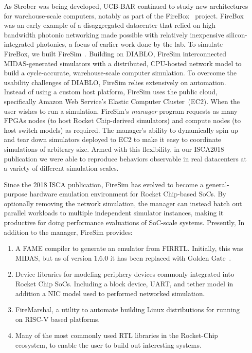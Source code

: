 As Strober was being developed, UCB-BAR continued to study new architectures for
warehouse-scale computers, notably as part of the FireBox~\cite{FireBox} project.
FireBox was an early example of a disaggregated datacenter that relied on
high-bandwidth photonic networking made possible with relatively inexpensive
silicon-integrated photonics, a focus of earlier work done by the lab.  To
simulate FireBox, we built FireSim~\cite{FireSim}. Building on DIABLO, FireSim interconnected MIDAS-generated
simulators with a distributed, CPU-hosted network model to build a
cycle-accurate, warehouse-scale computer simulation. To overcome the usability
challenges of DIABLO, FireSim relies extensively on automation.  Instead of
using a custom host platform, FireSim uses the public cloud, specifically
Amazon Web Service's Elastic Computer Cluster~(EC2).  When the user wishes to run a simulation, FireSim's \emph{manager} program
requests as many FPGAs nodes (to host
Rocket Chip-derived simulators) and compute nodes (to host switch models) as
required. The manager's ability to dynamically spin up and tear down simulators
deployed to EC2 to make it easy to coordinate simulations of arbitrary size. Armed with this flexibility, in our
ISCA2018 publication we were able to reproduce behaviors observable in real
datacenters at a variety of different simulation scales.

Since the 2018 ISCA publication, FireSim has evolved to become a
general-purpose hardware emulation environment for Rocket Chip-based SoCs. By
optionally removing the network simulation, the manager can instead batch out
parallel workloads to multiple independent simulator instances, making it
productive for doing performance evaluations of SoC-scale systems.
Presently, In addition to the manager, FireSim provides:
\begin{enumerate}
    \item A FAME compiler to generate an emulator from FIRRTL. Initially, this
        was MIDAS, but as of version 1.6.0 it has been replaced with Golden Gate~\cite{GoldenGate}.
    \item Device libraries for modeling periphery devices commonly integrated into Rocket Chip SoCs. Including a block device, UART,
        and tether model in addition a NIC model used to performed networked simulation.
    \item FireMarshal, a utility to automate building Linux distributions for
        running on RISC-V based platforms.
    \item Many of the most commonly used RTL libraries in the Rocket-Chip ecosystem, to enable the user to build out interesting systems.
\end{enumerate}


